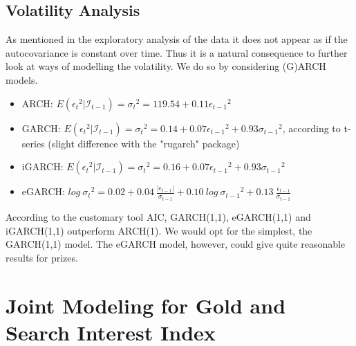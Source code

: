 \documentclass[a4paper]{article}
\theoremstyle{definition}
\begin{document}
\subsection{Volatility Analysis}
As mentioned in the exploratory analysis of the data it does not appear as if the autocovariance is constant over time. Thus it is a natural consequence to further look at ways of modelling the volatility. We do so by considering (G)ARCH models.


	\begin{itemize}
 		\item ARCH: $E({\epsilon_t}^2 | \mathcal{I}_{t-1})= {\sigma_t}^2 = 119.54 + 0.11 {\epsilon_{t-1}}^2$
 		\item GARCH: $E({\epsilon_t}^2 | \mathcal{I}_{t-1})= {\sigma_t}^2 = 0.14 + 0.07 {\epsilon_{t-1}}^2 + 0.93 {\sigma_{t-1}}^2$, according to t-series (slight difference with the "rugarch" package)
  		\item iGARCH: $E({\epsilon_t}^2 | \mathcal{I}_{t-1})= {\sigma_t}^2 = 0.16 + 0.07 {\epsilon_{t-1}}^2 + 0.93 {\sigma_{t-1}}^2$
		\item eGARCH: $log\ {\sigma_t}^2 = 0.02 +0.04\ \frac{| \epsilon_{t-1}|}{\sigma_{t-1}} + 0.10\ log\ {\sigma_{t-1}}^2+ 0.13\ \frac{ \epsilon_{t-1}}{\sigma_{t-1}} $
	\end{itemize}


According to the customary tool AIC, GARCH(1,1), eGARCH(1,1) and iGARCH(1,1) outperform ARCH(1). We would opt for the simplest, the GARCH(1,1) model. The eGARCH model, however, could give quite reasonable results for prizes.

\newpage
\section{Joint Modeling for Gold and Search Interest Index}
\end{document}
